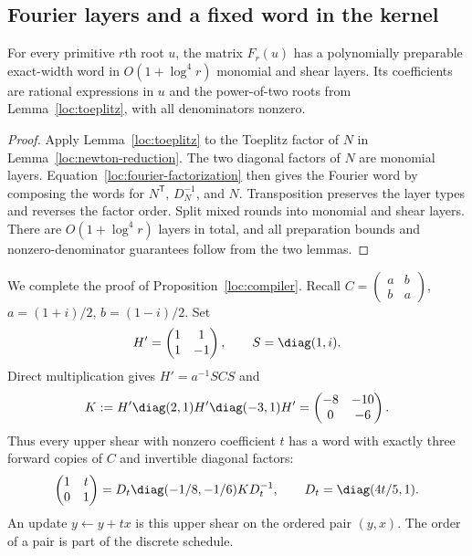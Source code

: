 \subsection{Fourier layers and a fixed word in the kernel}

\begin{lemma}\label{loc:fourier}
For every primitive $r$th root $u$, the matrix $F_r(u)$ has a
polynomially preparable exact-width word in
$O(1+\log^4r)$ monomial and shear layers.  Its coefficients are rational
expressions in $u$ and the power-of-two roots from
Lemma~\ref{loc:toeplitz}, with all denominators nonzero.
\end{lemma}

\begin{proof}
Apply Lemma~\ref{loc:toeplitz} to the Toeplitz factor of $N$ in
Lemma~\ref{loc:newton-reduction}.  The two diagonal factors of $N$
are monomial layers.  Equation~\eqref{loc:fourier-factorization}
then gives the Fourier word by composing the words for $N^{\mathsf T}$,
$D_N^{-1}$, and $N$.  Transposition preserves the layer types and
reverses the factor order.  Split mixed rounds into monomial and shear
layers.  There are $O(1+\log^4r)$ layers in total, and all preparation
bounds and nonzero-denominator guarantees follow from the two lemmas.
\end{proof}

We complete the proof of Proposition~\ref{loc:compiler}.  Recall
$C=\left(\begin{smallmatrix}a&b\\b&a\end{smallmatrix}\right)$,
$a=(1+i)/2$, $b=(1-i)/2$.  Set
\[
 H'=\begin{pmatrix}1&1\\1&-1\end{pmatrix},\qquad
 S=\diag(1,i).
\]
Direct multiplication gives $H'=a^{-1}SCS$ and
\begin{equation}\label{loc:three-kernel}
 K:=H'\diag(2,1)H'\diag(-3,1)H'
     =\begin{pmatrix}-8&-10\\0&-6\end{pmatrix}.
\end{equation}
Thus every upper shear with nonzero coefficient $t$ has a word with
exactly three forward copies of $C$ and invertible diagonal factors:
\begin{equation}\label{loc:nonzero-shear}
 \begin{pmatrix}1&t\\0&1\end{pmatrix}
 =D_t\diag(-1/8,-1/6)K D_t^{-1},\qquad
 D_t=\diag(4t/5,1).
\end{equation}
An update $y\gets y+t x$ is this upper shear on the ordered pair
$(y,x)$.  The order of a pair is part of the discrete schedule.

